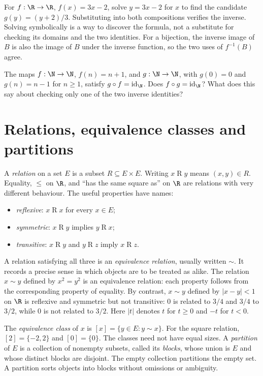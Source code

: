For $f:\R\to\R$, $f(x)=3x-2$, solve $y=3x-2$ for $x$ to find the candidate
$g(y)=(y+2)/3$. Substituting into both compositions verifies the inverse.
Solving symbolically is a way to discover the formula, not a substitute for checking
its domains and the two identities. For a bijection, the inverse image of $B$
is also the image of $B$ under the inverse function, so the two uses of $f^{-1}(B)$ agree.

\begin{think}
The maps $f:\N\to\N$, $f(n)=n+1$, and $g:\N\to\N$, with $g(0)=0$ and
$g(n)=n-1$ for $n\ge1$, satisfy $g\circ f=\operatorname{id}_{\N}$.
Does $f\circ g=\operatorname{id}_{\N}$? What does this say about checking only
one of the two inverse identities?
\end{think}

\section{Relations, equivalence classes and partitions}

A \emph{relation} on a set $E$ is a subset $R\subseteq E\times E$.
Writing $x\mathrel R y$ means $(x,y)\in R$. Equality, $\le$ on $\R$, and
``has the same square as'' on $\R$ are relations with very different behaviour.
The useful properties have names:
\begin{itemize}
\item \emph{reflexive}: $x\mathrel R x$ for every $x\in E$;
\item \emph{symmetric}: $x\mathrel R y$ implies $y\mathrel R x$;
\item \emph{transitive}: $x\mathrel R y$ and $y\mathrel R z$ imply $x\mathrel R z$.
\end{itemize}
A relation satisfying all three is an \emph{equivalence relation}, usually written $\sim$.
It records a precise sense in which objects are to be treated as alike.
The relation $x\sim y$ defined by $x^2=y^2$ is an equivalence relation:
each property follows from the corresponding property of equality.
By contrast, $x\sim y$ defined by $|x-y|<1$ on $\R$ is reflexive and symmetric
but not transitive: $0$ is related to $3/4$ and $3/4$ to $3/2$, while $0$ is
not related to $3/2$. Here $|t|$ denotes $t$ for $t\ge0$ and $-t$ for $t<0$.

The \emph{equivalence class} of $x$ is
$[x]=\{y\in E:y\sim x\}$. For the square relation, $[2]=\{-2,2\}$
and $[0]=\{0\}$. The classes need not have equal sizes. A \emph{partition}
of $E$ is a collection of nonempty subsets, called its \emph{blocks}, whose union
is $E$ and whose distinct blocks are disjoint. The empty collection partitions
the empty set. A partition sorts objects into blocks without omissions or ambiguity.

